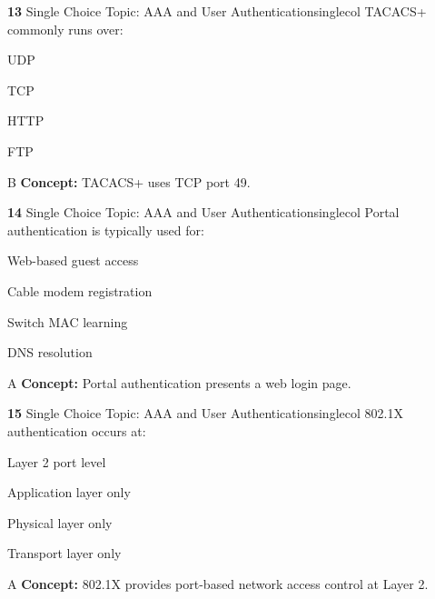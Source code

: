 \documentclass[10pt,a4paper]{article}
\begin{document}
\begin{qcard}{\color{white}\textbf{13} \hfill \small Single Choice \textbar{} Topic: AAA and User Authentication}{singlecol}
TACACS+ commonly runs over:

\begin{qoptions}
\item UDP
\item TCP
\item HTTP
\item FTP
\end{qoptions}
\begin{explainbox}{B}
\textbf{Concept:} TACACS+ uses TCP port 49.
\end{explainbox}
\end{qcard}

\begin{qcard}{\color{white}\textbf{14} \hfill \small Single Choice \textbar{} Topic: AAA and User Authentication}{singlecol}
Portal authentication is typically used for:

\begin{qoptions}
\item Web-based guest access
\item Cable modem registration
\item Switch MAC learning
\item DNS resolution
\end{qoptions}
\begin{explainbox}{A}
\textbf{Concept:} Portal authentication presents a web login page.
\end{explainbox}
\end{qcard}

\begin{qcard}{\color{white}\textbf{15} \hfill \small Single Choice \textbar{} Topic: AAA and User Authentication}{singlecol}
802.1X authentication occurs at:

\begin{qoptions}
\item Layer 2 port level
\item Application layer only
\item Physical layer only
\item Transport layer only
\end{qoptions}
\begin{explainbox}{A}
\textbf{Concept:} 802.1X provides port-based network access control at Layer 2.
\end{explainbox}
\end{qcard}
\end{document}
